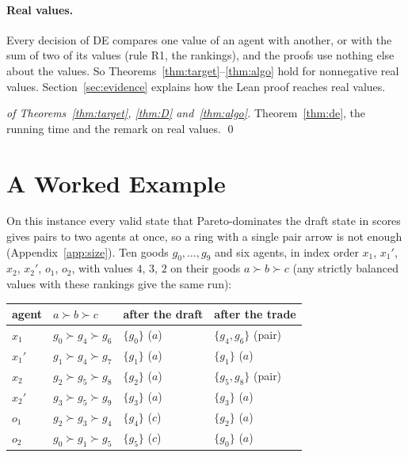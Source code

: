 \documentclass[runningheads,11pt]{llncs}
\newcommand{\DE}{\textup{DE}}
\begin{document}
\paragraph{Real values.} Every decision of \DE{} compares one value of an agent with another, or with the sum of two of its values (rule R1, the rankings), and the proofs use nothing else about the values. So Theorems~\ref{thm:target}--\ref{thm:algo} hold for nonnegative real values. Section~\ref{sec:evidence} explains how the Lean proof reaches real values.

\begin{proof}[of Theorems~\ref{thm:target}, \ref{thm:D} and~\ref{thm:algo}]
Theorem~\ref{thm:de}, the running time and the remark on real values. \qed
\end{proof}

\section{A Worked Example}\label{sec:example}

On this instance every valid state that Pareto-dominates the draft state in scores gives pairs to two agents at once, so a ring with a single pair arrow is not enough (Appendix~\ref{app:size}). Ten goods $g_0,\dots,g_9$ and six agents, in index order $x_1$, $x_1'$, $x_2$, $x_2'$, $o_1$, $o_2$, with values $4$, $3$, $2$ on their goods $a\succ b\succ c$ (any strictly balanced values with these rankings give the same run):
\begin{center}
\setlength{\tabcolsep}{6pt}\begin{tabular}{@{}llll@{}}
\toprule
agent & $a\succ b\succ c$ & after the draft & after the trade \\
\midrule
$x_1$ & $g_0\succ g_4\succ g_6$ & $\{g_0\}$ ($a$) & $\{g_4,g_6\}$ (pair) \\
$x_1'$ & $g_1\succ g_4\succ g_7$ & $\{g_1\}$ ($a$) & $\{g_1\}$ ($a$) \\
$x_2$ & $g_2\succ g_5\succ g_8$ & $\{g_2\}$ ($a$) & $\{g_5,g_8\}$ (pair) \\
$x_2'$ & $g_3\succ g_5\succ g_9$ & $\{g_3\}$ ($a$) & $\{g_3\}$ ($a$) \\
$o_1$ & $g_2\succ g_3\succ g_4$ & $\{g_4\}$ ($c$) & $\{g_2\}$ ($a$) \\
$o_2$ & $g_0\succ g_1\succ g_5$ & $\{g_5\}$ ($c$) & $\{g_0\}$ ($a$) \\
\bottomrule
\end{tabular}
\end{center}
\end{document}
